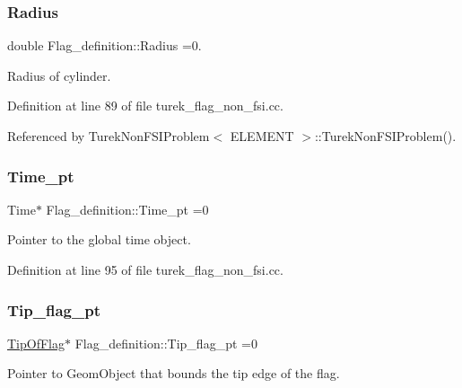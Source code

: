 \subsubsection{\texorpdfstring{Radius}{Radius}}
{\footnotesize\ttfamily double Flag\+\_\+definition\+::\+Radius =0.}



Radius of cylinder. 



Definition at line 89 of file turek\+\_\+flag\+\_\+non\+\_\+fsi.\+cc.



Referenced by Turek\+Non\+F\+S\+I\+Problem$<$ E\+L\+E\+M\+E\+N\+T $>$\+::\+Turek\+Non\+F\+S\+I\+Problem().

\mbox{\label{namespaceFlag__definition_adc7ca9d539ba8569c5eaa574de22c08f}} 
\subsubsection{\texorpdfstring{Time\+\_\+pt}{Time\_pt}}
{\footnotesize\ttfamily Time$\ast$ Flag\+\_\+definition\+::\+Time\+\_\+pt =0}



Pointer to the global time object. 



Definition at line 95 of file turek\+\_\+flag\+\_\+non\+\_\+fsi.\+cc.

\mbox{\label{namespaceFlag__definition_a17de6efd8447ee9c2bb5a1767084ecef}} 
\subsubsection{\texorpdfstring{Tip\+\_\+flag\+\_\+pt}{Tip\_flag\_pt}}
{\footnotesize\ttfamily \hyperlink{classFlag__definition_1_1TipOfFlag}{Tip\+Of\+Flag}$\ast$ Flag\+\_\+definition\+::\+Tip\+\_\+flag\+\_\+pt =0}



Pointer to Geom\+Object that bounds the tip edge of the flag. 



